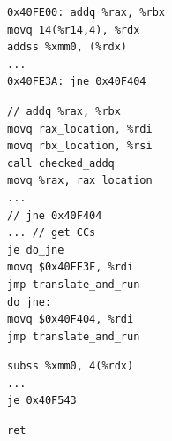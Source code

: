 \documentclass[tikz]{standalone}
\begin{document}
\begin{lrbox}{\binTranslateOrig}
\begin{lstlisting}
0x40FE00: addq %rax, %rbx
movq 14(%r14,4), %rdx
addss %xmm0, (%rdx)
...
0x40FE3A: jne 0x40F404
\end{lstlisting}
\end{lrbox}
\begin{lrbox}{\binTranslateBBa}
\begin{lstlisting}
// addq %rax, %rbx
movq rax_location, %rdi
movq rbx_location, %rsi
call checked_addq
movq %rax, rax_location
...
// jne 0x40F404
... // get CCs 
je do_jne
movq $0x40FE3F, %rdi
jmp translate_and_run
do_jne:
movq $0x40F404, %rdi
jmp translate_and_run
\end{lstlisting}
\end{lrbox}
\begin{lrbox}{\binTranslateBBb}
\begin{lstlisting}
subss %xmm0, 4(%rdx)
...
je 0x40F543
\end{lstlisting}
\end{lrbox}
\begin{lrbox}{\binTranslateBBc}
\begin{lstlisting}
ret
\end{lstlisting}
\end{lrbox}




\end{document}
